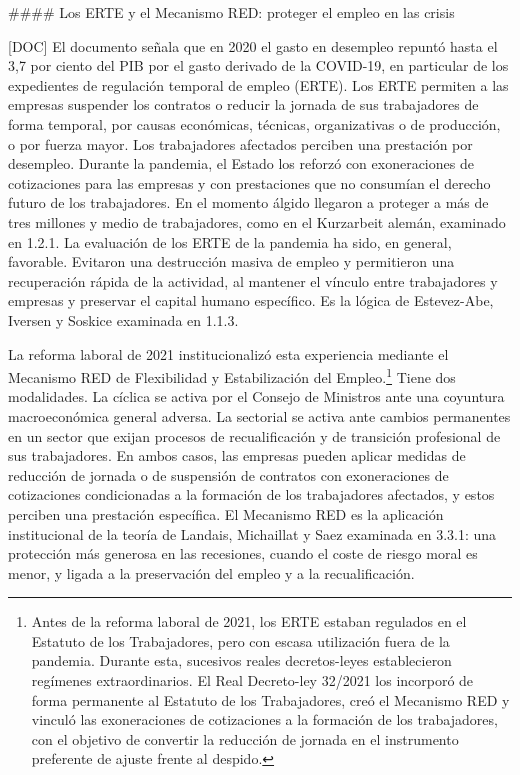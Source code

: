 \documentclass[10pt,a4paper]{article}
\begin{document}
#### Los ERTE y el Mecanismo RED: proteger el empleo en las crisis

[DOC] El documento señala que en 2020 el gasto en desempleo repuntó hasta el 3,7 por ciento del PIB por el gasto derivado de la COVID-19, en particular de los expedientes de regulación temporal de empleo (ERTE). Los ERTE permiten a las empresas suspender los contratos o reducir la jornada de sus trabajadores de forma temporal, por causas económicas, técnicas, organizativas o de producción, o por fuerza mayor. Los trabajadores afectados perciben una prestación por desempleo. Durante la pandemia, el Estado los reforzó con exoneraciones de cotizaciones para las empresas y con prestaciones que no consumían el derecho futuro de los trabajadores. En el momento álgido llegaron a proteger a más de tres millones y medio de trabajadores, como en el Kurzarbeit alemán, examinado en 1.2.1. La evaluación de los ERTE de la pandemia ha sido, en general, favorable. Evitaron una destrucción masiva de empleo y permitieron una recuperación rápida de la actividad, al mantener el vínculo entre trabajadores y empresas y preservar el capital humano específico. Es la lógica de Estevez-Abe, Iversen y Soskice examinada en 1.1.3.

La reforma laboral de 2021 institucionalizó esta experiencia mediante el Mecanismo RED de Flexibilidad y Estabilización del Empleo.\footnote{%
    Antes de la reforma laboral de 2021, los ERTE estaban regulados en el Estatuto de los Trabajadores, pero con escasa utilización fuera de la pandemia. Durante esta, sucesivos reales decretos-leyes establecieron regímenes extraordinarios. El Real Decreto-ley 32/2021 los incorporó de forma permanente al Estatuto de los Trabajadores, creó el Mecanismo RED y vinculó las exoneraciones de cotizaciones a la formación de los trabajadores, con el objetivo de convertir la reducción de jornada en el instrumento preferente de ajuste frente al despido.
} Tiene dos modalidades. La cíclica se activa por el Consejo de Ministros ante una coyuntura macroeconómica general adversa. La sectorial se activa ante cambios permanentes en un sector que exijan procesos de recualificación y de transición profesional de sus trabajadores. En ambos casos, las empresas pueden aplicar medidas de reducción de jornada o de suspensión de contratos con exoneraciones de cotizaciones condicionadas a la formación de los trabajadores afectados, y estos perciben una prestación específica. El Mecanismo RED es la aplicación institucional de la teoría de Landais, Michaillat y Saez examinada en 3.3.1: una protección más generosa en las recesiones, cuando el coste de riesgo moral es menor, y ligada a la preservación del empleo y a la recualificación.
\end{document}
